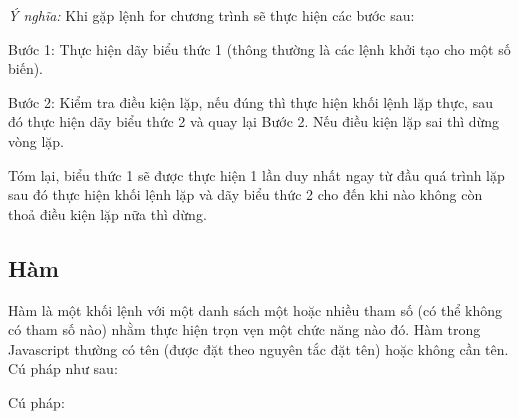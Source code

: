 \textit{Ý nghĩa:} Khi gặp lệnh {\ttfamily  for} chương trình sẽ thực hiện các bước sau: 

Bước 1: Thực hiện dãy biểu thức 1 (thông thường là các lệnh khởi tạo cho một số
biến).

Bước 2:  Kiểm tra {\ttfamily điều kiện lặp}, nếu đúng thì thực hiện {\ttfamily khối lệnh lặp} thực, sau đó thực hiện {\ttfamily dãy biểu thức 2} và quay lại Bước 2. Nếu {\ttfamily điều kiện lặp} sai thì dừng vòng lặp.

Tóm lại, {\ttfamily biểu thức 1} sẽ được thực hiện 1 lần duy nhất ngay từ đầu quá trình lặp 
sau đó thực hiện {\ttfamily khối lệnh lặp} và {\ttfamily dãy biểu thức 2} cho đến khi nào không còn thoả điều kiện lặp nữa thì dừng. 

\subsection{Hàm}
Hàm là một khối lệnh với một danh sách một hoặc nhiều tham số (có thể không có tham số nào) nhằm thực hiện trọn vẹn một chức năng nào đó. Hàm trong Javascript thường có tên (được đặt theo nguyên tắc đặt tên) hoặc không cần tên. Cú pháp như sau:

Cú pháp:

